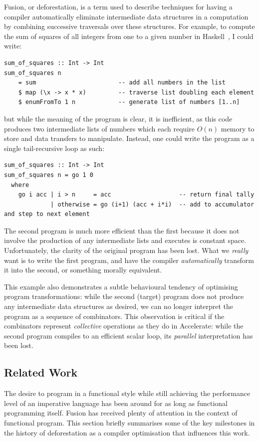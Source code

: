 Fusion, or deforestation, is a term used to describe techniques for having a
compiler automatically eliminate intermediate data structures in a computation
by combining successive traversals over these structures. For example, to
compute the sum of squares of all integers from one to a given number in
Haskell~\cite{Haskell:1998}, I could write:
%
\begin{lstlisting}[style=haskell]
sum_of_squares :: Int -> Int
sum_of_squares n
    = sum                       -- add all numbers in the list
    $ map (\x -> x * x)         -- traverse list doubling each element
    $ enumFromTo 1 n            -- generate list of numbers [1..n]
\end{lstlisting}
%
but while the meaning of the program is clear, it is inefficient, as this code
produces two intermediate lists of numbers which each require $O(n)$ memory to
store and data transfers to manipulate. Instead, one could write the program
as a single tail-recursive loop as such:
%
\begin{lstlisting}[style=haskell]
sum_of_squares :: Int -> Int
sum_of_squares n = go 1 0
  where
    go i acc | i > n     = acc                   -- return final tally
             | otherwise = go (i+1) (acc + i*i)  -- add to accumulator and step to next element
\end{lstlisting}
%
The second program is much more efficient than the first because it does not
involve the production of any intermediate lists and executes is constant space.
Unfortunately, the clarity of the original program has been lost. What we
\emph{really} want is to write the first program, and have the compiler
\emph{automatically} transform it into the second, or something morally
equivalent.

This example also demonstrates a subtle behavioural tendency of optimising
program transformations: while the second (target) program does not produce any
intermediate data structures as desired, we can no longer interpret the program
as a sequence of combinators. This observation is critical if the combinators
represent \emph{collective} operations as they do in Accelerate: while the
second program compiles to an efficient scalar loop, its \emph{parallel}
interpretation has been lost.


\subsection{Related Work}
\label{sec:fusion_related_work}

The desire to program in a functional style while still achieving the
performance level of an imperative language has been around for as long as
functional programming itself. Fusion has received plenty of attention in the
context of functional program. This section briefly summarises some of the key
milestones in the history of deforestation as a compiler optimisation that
influences this work.

